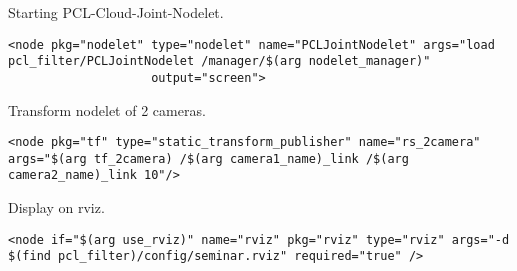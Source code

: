 				Starting PCL-Cloud-Joint-Nodelet.\\
				\begin{lstlisting}[caption={}]
					<node pkg="nodelet" type="nodelet" name="PCLJointNodelet" args="load pcl_filter/PCLJointNodelet /manager/$(arg nodelet_manager)"
					output="screen">
				\end{lstlisting}
				
				Transform nodelet of 2 cameras.\\
				\begin{lstlisting}[caption={}]
					<node pkg="tf" type="static_transform_publisher" name="rs_2camera" args="$(arg tf_2camera) /$(arg camera1_name)_link /$(arg camera2_name)_link 10"/>
				\end{lstlisting}
				
				Display on rviz.\\
				\begin{lstlisting}[caption={}]
					<node if="$(arg use_rviz)" name="rviz" pkg="rviz" type="rviz" args="-d $(find pcl_filter)/config/seminar.rviz" required="true" />
				\end{lstlisting}